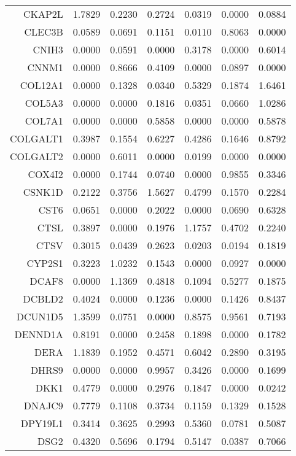 \begin{longtable}{rrrrrrr}
  CKAP2L & 1.7829 & 0.2230 & 0.2724 & 0.0319 & 0.0000 & 0.0884 \\ 
  CLEC3B & 0.0589 & 0.0691 & 0.1151 & 0.0110 & 0.8063 & 0.0000 \\ 
  CNIH3 & 0.0000 & 0.0591 & 0.0000 & 0.3178 & 0.0000 & 0.6014 \\ 
  CNNM1 & 0.0000 & 0.8666 & 0.4109 & 0.0000 & 0.0897 & 0.0000 \\ 
  COL12A1 & 0.0000 & 0.1328 & 0.0340 & 0.5329 & 0.1874 & 1.6461 \\ 
  COL5A3 & 0.0000 & 0.0000 & 0.1816 & 0.0351 & 0.0660 & 1.0286 \\ 
  COL7A1 & 0.0000 & 0.0000 & 0.5858 & 0.0000 & 0.0000 & 0.5878 \\ 
  COLGALT1 & 0.3987 & 0.1554 & 0.6227 & 0.4286 & 0.1646 & 0.8792 \\ 
  COLGALT2 & 0.0000 & 0.6011 & 0.0000 & 0.0199 & 0.0000 & 0.0000 \\ 
  COX4I2 & 0.0000 & 0.1744 & 0.0740 & 0.0000 & 0.9855 & 0.3346 \\ 
  CSNK1D & 0.2122 & 0.3756 & 1.5627 & 0.4799 & 0.1570 & 0.2284 \\ 
  CST6 & 0.0651 & 0.0000 & 0.2022 & 0.0000 & 0.0690 & 0.6328 \\ 
  CTSL & 0.3897 & 0.0000 & 0.1976 & 1.1757 & 0.4702 & 0.2240 \\ 
  CTSV & 0.3015 & 0.0439 & 0.2623 & 0.0203 & 0.0194 & 0.1819 \\ 
  CYP2S1 & 0.3223 & 1.0232 & 0.1543 & 0.0000 & 0.0927 & 0.0000 \\ 
  DCAF8 & 0.0000 & 1.1369 & 0.4818 & 0.1094 & 0.5277 & 0.1875 \\ 
  DCBLD2 & 0.4024 & 0.0000 & 0.1236 & 0.0000 & 0.1426 & 0.8437 \\ 
  DCUN1D5 & 1.3599 & 0.0751 & 0.0000 & 0.8575 & 0.9561 & 0.7193 \\ 
  DENND1A & 0.8191 & 0.0000 & 0.2458 & 0.1898 & 0.0000 & 0.1782 \\ 
  DERA & 1.1839 & 0.1952 & 0.4571 & 0.6042 & 0.2890 & 0.3195 \\ 
  DHRS9 & 0.0000 & 0.0000 & 0.9957 & 0.3426 & 0.0000 & 0.1699 \\ 
  DKK1 & 0.4779 & 0.0000 & 0.2976 & 0.1847 & 0.0000 & 0.0242 \\ 
  DNAJC9 & 0.7779 & 0.1108 & 0.3734 & 0.1159 & 0.1329 & 0.1528 \\ 
  DPY19L1 & 0.3414 & 0.3625 & 0.2993 & 0.5360 & 0.0781 & 0.5087 \\ 
  DSG2 & 0.4320 & 0.5696 & 0.1794 & 0.5147 & 0.0387 & 0.7066 \\ 

\end{longtable}
